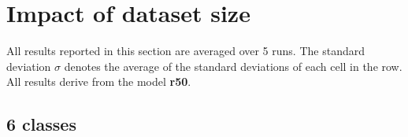 \documentclass[oneside, english, bibtex]{kththesis}
\begin{document}
\clearpage

\section{Impact of dataset size}

All results reported in this section are averaged over 5 runs. The standard deviation $\sigma$ denotes the average of the standard deviations of each cell in the row. All results derive from the model \textbf{r50}.

\subsection{6 classes}


\begin{table}[H]
  \begin{center}
    \caption{Gradually increasing dataset size - 6 classes - In-set}
    \label{tab:dsizeallcinset}
  \end{center}
\end{table}
\end{document}
